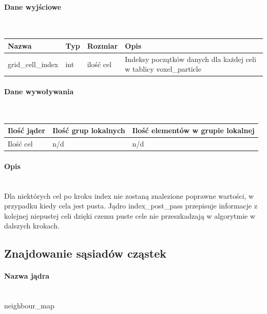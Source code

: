 \documentclass[polish, 12pt]{aghthesis}
\begin{document}
				\paragraph{Dane wyjściowe} \ \\
					\begin{tabular}{| p{} | p{} | p{} | p{} |}
					\hline
						Nazwa & Typ & Rozmiar & Opis \\
					\hline
						grid\_cell\_index & int & ilość cel & Indeksy początków danych dla każdej celi w tablicy voxel\_particle \\
					\hline
				\end{tabular}
				\paragraph{Dane wywoływania} \ \\
					\begin{tabular}{| p{} | p{} | p{}|}
					\hline
						Ilość jąder & Ilość grup lokalnych & Ilość elementów w grupie lokalnej \\
					\hline
						Ilość cel & n/d & n/d \\ 
					\hline
					\end{tabular}
				\paragraph{Opis} \ \\
					\indent Dla niektórych cel po kroku index nie zostaną znalezione poprawne wartości, w przypadku kiedy cela jest pusta. Jądro index\_post\_pass przepisuje informacje z kolejnej niepustej celi dzięki czemu puste cele nie przeszkadzają w algorytmie w dalszych krokach.
					
		\subsection{Znajdowanie sąsiadów cząstek}
			\paragraph{Nazwa jądra} \ \\
					neighbour\_map
\end{document}

